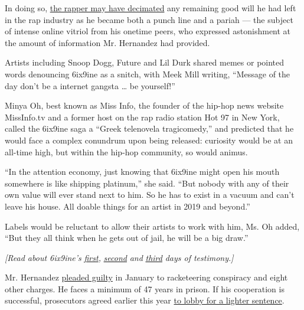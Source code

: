 In doing so,
\href{https://www.nytimes3xbfgragh.onion/2019/09/24/nyregion/tekashi-69-witness-protection-program.html}{the
rapper may have decimated} any remaining good will he had left in the
rap industry as he became both a punch line and a pariah --- the subject
of intense online vitriol from his onetime peers, who expressed
astonishment at the amount of information Mr. Hernandez had provided.

Artists including Snoop Dogg, Future and Lil Durk shared memes or
pointed words denouncing 6ix9ine as a snitch, with Meek Mill writing,
``Message of the day don't be a internet gangsta \ldots{} be yourself!''

Minya Oh, best known as Miss Info, the founder of the hip-hop news
website MissInfo.tv and a former host on the rap radio station Hot 97 in
New York, called the 6ix9ine saga a ``Greek telenovela tragicomedy,''
and predicted that he would face a complex conundrum upon being
released: curiosity would be at an all-time high, but within the hip-hop
community, so would animus.

``In the attention economy, just knowing that 6ix9ine might open his
mouth somewhere is like shipping platinum,'' she said. ``But nobody with
any of their own value will ever stand next to him. So he has to exist
in a vacuum and can't leave his house. All doable things for an artist
in 2019 and beyond.''

Labels would be reluctant to allow their artists to work with him, Ms.
Oh added, ``But they all think when he gets out of jail, he will be a
big draw.''

\emph{{[}Read about 6ix9ine's}
\href{https://www.nytimes3xbfgragh.onion/2019/09/17/nyregion/tekashi-69-testifying-court-trial.html?module=inline}{\emph{first}}\emph{,}
\href{https://www.nytimes3xbfgragh.onion/2019/09/18/nyregion/tekashi-69-testifies-testimony-stand-court.html?module=inline}{\emph{second}}
\emph{and}
\href{https://www.nytimes3xbfgragh.onion/2019/09/19/nyregion/tekashi-69-case-testimony-jim-jones.html?module=inline}{\emph{third}}
\emph{days of testimony.{]}}

Mr. Hernandez
\href{https://www.nytimes3xbfgragh.onion/2019/02/01/nyregion/tekashi-69-pleads-guilty.html}{pleaded
guilty} in January to racketeering conspiracy and eight other charges.
He faces a minimum of 47 years in prison. If his cooperation is
successful, prosecutors agreed earlier this year
\href{https://www.nytimes3xbfgragh.onion/2019/12/04/nyregion/tekashi-69-sentencing.html}{to
lobby for a lighter sentence}.

